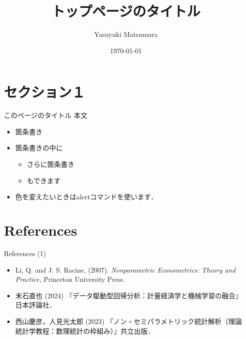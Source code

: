\documentclass[xcolor=svgnames,dvipdfmx,cjk]{beamer}
\theoremstyle{example}
\begin{document}
 

\title[足元表示のタイトル]{トップページのタイトル} 
\author[Y. Matsumura]{Yasuyuki Matsumura}          
\date{\today}


\begin{frame}                  
\titlepage                     
\end{frame}



\section{セクション１}

\begin{frame}{このページのタイトル}
  本文
  \begin{itemize}
    \item 箇条書き
    \item 箇条書きの中に
    \begin{itemize}
      \item さらに箇条書き
      \item もできます
    \end{itemize}
    \item 色を変えたいときは\alert{alert}コマンドを使います．
  \end{itemize}
\end{frame}

\section{References}


\begin{frame}{References (1)}
  \begin{itemize}
    \item Li, Q. and J. S. Racine, (2007). 
          \textit{Nonparametric Econometrics: Theory and Practice,} 
          Princeton University Press.
    \item 末石直也 (2024) 『データ駆動型回帰分析：計量経済学と機械学習の融合』日本評論社．
    \item 西山慶彦，人見光太郎 (2023) 『ノン・セミパラメトリック統計解析（理論統計学教程：数理統計の枠組み）』共立出版．
  \end{itemize}
\end{frame}
\end{document}
